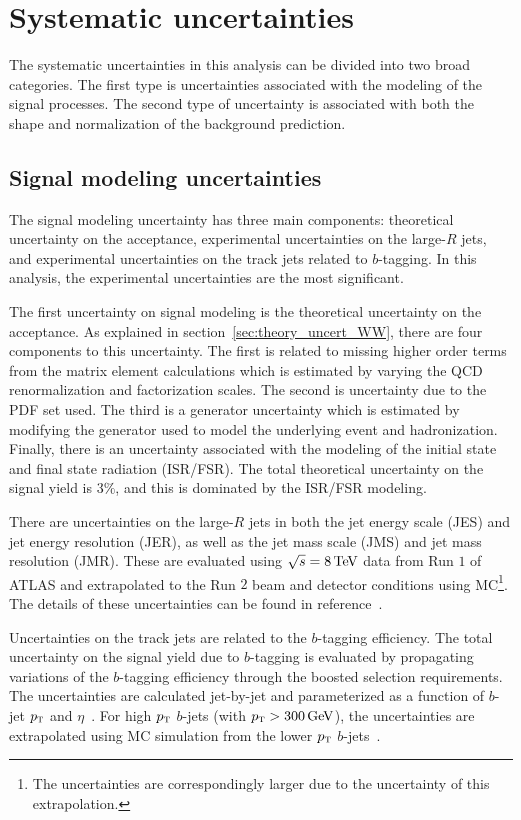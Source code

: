 \section{Systematic uncertainties}

The systematic uncertainties in this analysis can be divided into two broad categories. The first type is uncertainties associated with the modeling of the signal processes. The second type of uncertainty is associated with both the shape and normalization of the background prediction. 

\subsection{Signal modeling uncertainties}

The signal modeling uncertainty has three main components: theoretical uncertainty on the acceptance, experimental uncertainties on the large-$R$ jets, and experimental uncertainties on the track jets related to $b$-tagging. In this analysis, the experimental uncertainties are the most significant. 

The first uncertainty on signal modeling is the theoretical uncertainty on the acceptance. As explained in section~\ref{sec:theory_uncert_WW}, there are four components to this uncertainty. The first is related to missing higher order terms from the matrix element calculations which is estimated by varying the QCD renormalization and factorization scales. The second is uncertainty due to the PDF set used. The third is a generator uncertainty which is estimated by modifying the generator used to model the underlying event and hadronization. Finally, there is an uncertainty associated with the modeling of the initial state and final state radiation (ISR/FSR). The total theoretical uncertainty on the signal yield is $3\%$, and this is dominated by the ISR/FSR modeling.

There are uncertainties on the large-$R$ jets in both the jet energy scale (JES) and jet energy resolution (JER), as well as the jet mass scale (JMS) and jet mass resolution (JMR). These are evaluated using $\sqrt{s} = 8 \TeV$ data from Run $1$ of ATLAS and extrapolated to the Run $2$ beam and detector conditions using MC\footnote{The uncertainties are correspondingly larger due to the uncertainty of this extrapolation.}. The details of these uncertainties can be found in reference~\cite{LargeRUncert}. 

Uncertainties on the track jets are related to the $b$-tagging efficiency. The total uncertainty on the signal yield due to $b$-tagging is evaluated by propagating variations of the $b$-tagging efficiency through the boosted selection requirements. The uncertainties are calculated jet-by-jet and parameterized as a function of $b$-jet $p_{\textrm{\footnotesize\sc t}}$ and $\eta$~\cite{BtagCalib1}. For high $p_{\textrm{\footnotesize\sc t}}$ $b$-jets (with $\pT > 300 \GeV$), the uncertainties are extrapolated using MC simulation from the lower $p_{\textrm{\footnotesize\sc t}}$ $b$-jets~\cite{Run1BJets}. 

